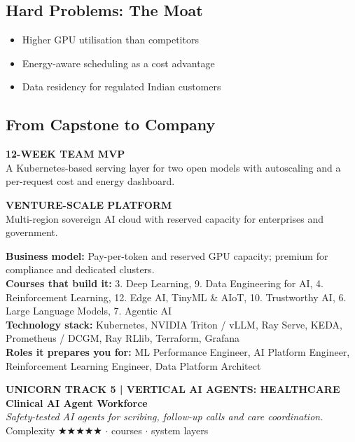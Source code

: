 \documentclass[10pt,a4paper]{article}
\begin{document}
\subsection*{Hard Problems: The Moat}\begin{itemize}\small
\item Higher GPU utilisation than competitors
\item Energy-aware scheduling as a cost advantage
\item Data residency for regulated Indian customers
\end{itemize}
\subsection*{From Capstone to Company}
\begin{tcbraster}[raster columns=2,raster equal height,raster column skip=8pt]\begin{tcolorbox}[colback=l1bg,colframe=l1bg,arc=2pt,borderline north={2.5pt}{0pt}{saffron}]{\scriptsize\bfseries\color{muted}12-WEEK TEAM MVP}\\\small A Kubernetes-based serving layer for two open models with autoscaling and a per-request cost and energy dashboard.\end{tcolorbox}\begin{tcolorbox}[colback=l3bg,colframe=l3bg,arc=2pt,borderline north={2.5pt}{0pt}{igreen}]{\scriptsize\bfseries\color{muted}VENTURE-SCALE PLATFORM}\\\small Multi-region sovereign AI cloud with reserved capacity for enterprises and government.\end{tcolorbox}\end{tcbraster}
{\small\textbf{Business model:} Pay-per-token and reserved GPU capacity; premium for compliance and dedicated clusters.\\\textbf{Courses that build it:} 3. Deep Learning, 9. Data Engineering for AI, 4. Reinforcement Learning, 12. Edge AI, TinyML \& AIoT, 10. Trustworthy AI, 6. Large Language Models, 7. Agentic AI\\\textbf{Technology stack:} Kubernetes, NVIDIA Triton / vLLM, Ray Serve, KEDA, Prometheus / DCGM, Ray RLlib, Terraform, Grafana\\\textbf{Roles it prepares you for:} ML Performance Engineer, AI Platform Engineer, Reinforcement Learning Engineer, Data Platform Architect}
\newpage
\begin{tcolorbox}[colback=navy,colframe=navy,arc=2pt,left=8pt,top=5pt,bottom=5pt]{\small\bfseries\color{goldl}UNICORN TRACK 5 \;|\; VERTICAL AI AGENTS: HEALTHCARE}\\[1pt]{\LARGE\bfseries\color{white}Clinical AI Agent Workforce}\\[2pt]{\small\itshape\color{goldl}Safety-tested AI agents for scribing, follow-up calls and care coordination.}\\[2pt]{\small\color{white}Complexity {\color{goldl}★★★★★} \;$\cdot$ courses \;$\cdot$ system layers}\end{tcolorbox}
\end{document}

